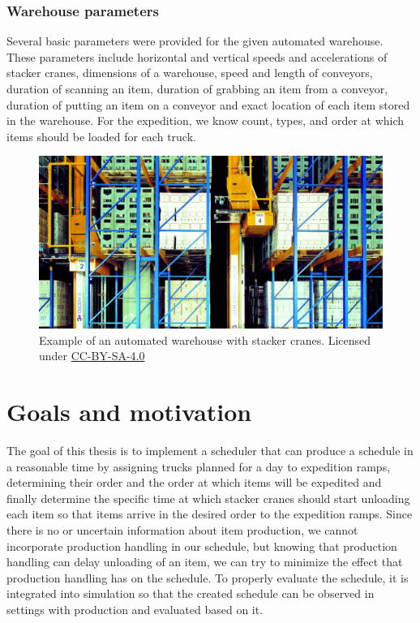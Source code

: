 \documentclass{ctuthesis}
\begin{document}
\subsubsection{Warehouse parameters}
\label{sec:availableinformation}
Several basic parameters were provided for the given automated warehouse. These parameters include horizontal and vertical speeds and accelerations of stacker cranes, dimensions of a warehouse, speed and length of conveyors, duration of scanning an item, duration of grabbing an item from a conveyor, duration of putting an item on a conveyor and exact location of each item stored in the warehouse. For the expedition, we know count, types, and order at which items should be loaded for each truck. 

\begin{figure}
\includegraphics[width=1\linewidth]{highbaywarehouse.jpg}
\caption{Example of an automated warehouse with stacker cranes. Licensed under \href{https://commons.wikimedia.org/wiki/Category:CC-BY-SA-4.0}{CC-BY-SA-4.0} \cite{warehousepic}}
\label{fig:hb}
\end{figure}

\section{Goals and motivation}

The goal of this thesis is to implement a scheduler that can produce a schedule in a reasonable time by assigning trucks planned for a day to expedition ramps, determining their order and the order at which items will be expedited and finally determine the specific time at which stacker cranes should start unloading each item so that items arrive in the desired order to the expedition ramps. Since there is no or uncertain information about item production, we cannot incorporate production handling in our schedule, but knowing that production handling can delay unloading of an item, we can try to minimize the effect that production handling has on the schedule. To properly evaluate the schedule, it is integrated into simulation so that the created schedule can be observed in settings with production and evaluated based on it. 
\end{document}
